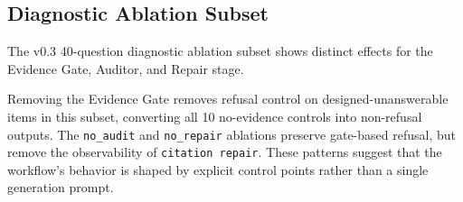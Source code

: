 \subsection{Diagnostic Ablation Subset}

The v0.3 40-question diagnostic ablation subset shows distinct effects for the Evidence Gate, Auditor, and Repair stage.

\begin{table}[t]
\centering
\caption{v0.3 40-question diagnostic ablation subset for \texttt{qwen2.5:latest}. Removing the Evidence Gate eliminates designed-unanswerable refusal control, while removing audit or repair removes \texttt{citation repair} observability. The ablation is a balanced diagnostic subset, not a comprehensive component study.}
\label{tab:ablation}
\end{table}

Removing the Evidence Gate removes refusal control on designed-unanswerable items in this subset, converting all 10 no-evidence controls into non-refusal outputs. The \texttt{no\_audit} and \texttt{no\_repair} ablations preserve gate-based refusal, but remove the observability of \texttt{citation repair}. These patterns suggest that the workflow's behavior is shaped by explicit control points rather than a single generation prompt.

